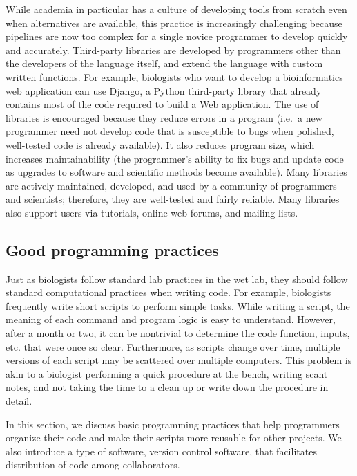\documentclass[ChapterTOCs,krantz2]{krantz} %
\begin{document}
While academia in particular has a culture of 
developing tools from scratch even when alternatives are available, this practice
is increasingly challenging because pipelines are now too complex for a single novice programmer 
to develop quickly and accurately\cite{Wilson2006}. Third-party libraries are developed 
by programmers other than the developers of the language itself, and extend the language
with custom written functions.  For example,   
biologists who want to develop a bioinformatics web application 
can use Django, a Python third-party library that already contains most of the
code required to build a Web application.  The use of libraries is encouraged because they
reduce errors in a program (i.e.\ a new programmer need not 
develop code that is susceptible to bugs when
polished, well-tested code is already available). It also reduces program size, 
which increases maintainability (the programmer's ability to fix 
bugs and update code as upgrades to software and scientific methods
become available).
Many libraries are actively maintained, developed, and used
by a community of programmers and scientists; therefore, they are well-tested
and fairly reliable. Many libraries also support users via tutorials, online
web forums, and mailing lists.


\subsection{Good programming practices}

Just as biologists follow standard lab practices in the wet lab, they
should follow standard computational practices when writing code.
For example, biologists frequently write short scripts to perform
simple tasks. While writing a script, the 
meaning of each command and program logic 
is easy to understand.  However, after a month or two, it can be
nontrivial to determine the code function, inputs, etc. that were once
so clear.
Furthermore, as scripts change over time, multiple versions of each script may be scattered 
over multiple computers. This problem is akin to a biologist performing a
quick procedure at the bench, writing scant notes, and not taking the time to a clean up or write down the procedure in detail.

In this section, we discuss basic programming
practices that help programmers organize their code and make their
scripts more reusable for other projects. We also introduce a type of
software, version control software, that facilitates
distribution of code among collaborators.
\end{document}
